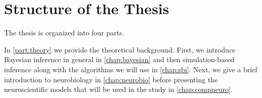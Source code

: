 \section{Structure of the Thesis}



The thesis is organized into four parts. 

In \autoref{part:theory} we provide the theoretical background. First, we introduce Bayesian inference in general in \cref{chap:bayesian} and then simulation-based inference along with the algorithms we will use in \cref{chap:sbi}. Next, we give a brief introduction to neurobiology in \cref{chap:neurobio} before presenting the neuroscientific models that will be used in the study in \cref{chap:compneuro}. 

